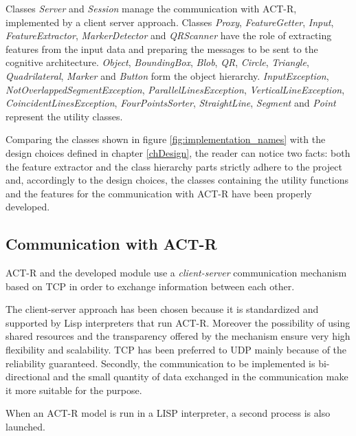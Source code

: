 		Classes \emph{Server} and \emph{Session} manage the communication with \mbox{ACT-R}, implemented by a client server approach.
		Classes \emph{Proxy}, \emph{FeatureGetter}, \emph{Input}, \emph{FeatureExtractor}, \emph{MarkerDetector} and \emph{QRScanner} have the role of extracting features from the input data and preparing the messages to be sent to the cognitive architecture.
		\emph{Object}, \emph{BoundingBox}, \emph{Blob}, \emph{QR}, \emph{Circle}, \emph{Triangle}, \emph{Quadrilateral}, \emph{Marker} and \emph{Button} form the object hierarchy.
		\emph{InputException}, \emph{NotOverlappedSegmentException}, \emph{ParallelLinesException}, \emph{VerticalLineException}, \emph{CoincidentLinesException}, \emph{FourPointsSorter}, \emph{StraightLine}, \emph{Segment} and \emph{Point} represent the utility classes.
	
		Comparing the classes shown in figure \ref{fig:implementation_names} with the design choices defined in chapter \ref{chDesign}, the reader can notice two facts: both the feature extractor and the class hierarchy parts strictly adhere to the project and, accordingly to the design choices, the classes containing the utility functions and the features for the communication with \mbox{ACT-R} have been properly developed.

	
		\subsection{Communication with ACT-R}
		\mbox{ACT-R} and the developed module use a \emph{client-server} communication mechanism based on \mbox{TCP} in order to exchange information between each other. 		

		The client-server approach has been chosen because it is standardized and supported by \mbox{Lisp} interpreters that run \mbox{ACT-R}. 
		Moreover the possibility of using shared resources and the transparency offered by the mechanism ensure very high flexibility and scalability.
		TCP has been preferred to \mbox{UDP} mainly because of the reliability guaranteed. Secondly, the communication to be implemented is bi-directional and the small quantity of data exchanged in the communication make it more suitable for the purpose.

		When an ACT-R model is run in a LISP interpreter, a second process is also launched. 

